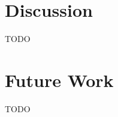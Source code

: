 \documentclass[logo,bsc,singlespacing,parskip,online]{infthesis}
\begin{document}
\section{Discussion}
TODO
\section{Future Work}
TODO



















\end{document}
